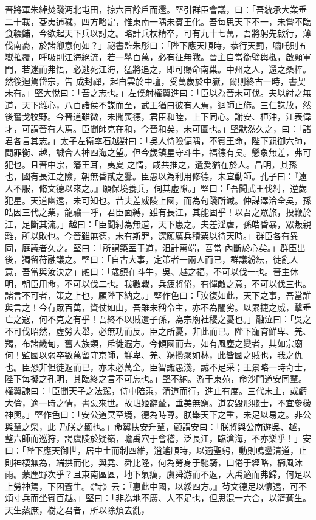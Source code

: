 \begin{pinyinscope}
 晉將軍朱綽焚踐沔北屯田，掠六百餘戶而還。堅引群臣會議，曰：「吾統承大業垂二十載，芟夷逋穢，四方略定，惟東南一隅未賓王化。吾每思天下不一，未嘗不臨食輟餔，今欲起天下兵以討之。略計兵杖精卒，可有九十七萬，吾將躬先啟行，薄伐南裔，於諸卿意何如？」祕書監朱彤曰：「陛下應天順時，恭行天罰，嘯吒則五嶽摧覆，呼吸則江海絕流，若一舉百萬，必有征無戰。晉主自當銜璧輿櫬，啟顙軍門，若迷而弗悟，必逃死江海，猛將追之，即可賜命南巢。中州之人，還之桑梓。然後迴駕岱宗，告
 成封禪，起白雲於中壇，受萬歲於中嶽，爾則終古一時，書契未有。」堅大悅曰：「吾之志也。」左僕射權翼進曰：「臣以為晉未可伐。夫以紂之無道，天下離心，八百諸侯不謀而至，武王猶曰彼有人焉，迴師止旆。三仁誅放，然後奮戈牧野。今晉道雖微，未聞喪德，君臣和睦，上下同心。謝安、桓沖，江表偉才，可謂晉有人焉。臣聞師克在和，今晉和矣，未可圖也。」堅默然久之，曰：「諸君各言其志。」太子左衛率石越對曰：「吳人恃險偏隅，不賓王命，陛下親御六師，問罪衡、越，誠合人神四海之望。但今歲鎮星守斗牛，福德有吳。懸象無差，弗可犯也。且晉中宗，籓王耳，夷夏
 之情，咸共推之，遺愛猶在於人。昌明，其孫也，國有長江之險，朝無昏貳之釁。臣愚以為利用修德，未宜動師。孔子曰：『遠人不服，脩文德以來之。』願保境養兵，伺其虛隙。」堅曰：「吾聞武王伐紂，逆歲犯星。天道幽遠，未可知也。昔夫差威陵上國，而為句踐所滅。仲謀澤洽全吳，孫皓因三代之業，龍驤一呼，君臣面縛，雖有長江，其能固乎！以吾之眾旅，投鞭於江，足斷其流。」越曰：「臣聞紂為無道，天下患之。夫差淫虐，孫皓昏暴，眾叛親離，所以敗也。今晉雖無德，未有斯罪，深願厲兵積粟以待天時。」群臣各有異同，庭議者久之。堅曰：「所謂築室于道，沮計萬端，吾當
 內斷於心矣。」群臣出後，獨留苻融議之。堅曰：「自古大事，定策者一兩人而已，群議紛紜，徒亂人意，吾當與汝決之」融曰：「歲鎮在斗牛，吳、越之福，不可以伐一也。晉主休明，朝臣用命，不可以伐二也。我數戰，兵疲將倦，有憚敵之意，不可以伐三也。諸言不可者，策之上也，願陛下納之。」堅作色曰：「汝復如此，天下之事，吾當誰與言之！今有眾百萬，資仗如山，吾雖未稱令主，亦不為闇劣。以累捷之威，擊垂亡之寇，何不克之有乎！吾終不以賊遺子孫，為宗廟社稷之憂也。」融泣曰：「吳之不可伐昭然，虛勞大舉，必無功而反。臣之所憂，非此而已。陛下寵育鮮卑、羌、
 羯，布諸畿甸，舊人族類，斥徙遐方。今傾國而去，如有風塵之變者，其如宗廟何！監國以弱卒數萬留守京師，鮮卑、羌、羯攢聚如林，此皆國之賊也，我之仇也。臣恐非但徒返而已，亦未必萬全。臣智識愚淺，誠不足采；王景略一時奇士，陛下每擬之孔明，其臨終之言不可忘也。」堅不納。游于東苑，命沙門道安同輦。權翼諫曰：「臣聞天子之法駕，侍中陪乘，清道而行，進止有度。三代末主，或虧大倫，適一時之情，書惡來世。故班姬辭輦，垂美無窮。道安毀形賤士，不宜參穢神輿。」堅作色曰：「安公道冥至境，德為時尊。朕舉天下之重，未足以易之。非公與輦之榮，此
 乃朕之顯也。」命翼扶安升輦，顧謂安曰：「朕將與公南遊吳、越，整六師而巡狩，謁虞陵於疑嶺，瞻禹穴于會稽，泛長江，臨滄海，不亦樂乎！」安曰：「陛下應天御世，居中土而制四維，逍遙順時，以適聖躬，動則鳴鑾清道，止則神棲無為，端拱而化，與堯、舜比隆，何為勞身于馳騎，口倦于經略，櫛風沐雨。蒙塵野次乎？且東南區區，地下氣癘，虞舜游而不返，大禹適而弗歸，何足以上勞神駕，下困蒼生。《詩》云：『惠此中國，以綏四方。』茍文德足以懷遠，可不煩寸兵而坐賓百越。」堅曰：「非為地不廣、人不足也，但思混一六合，以濟蒼生。天生蒸庶，樹之君者，所以除煩去亂，

\end{pinyinscope}
